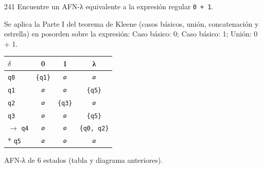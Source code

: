 \documentclass[11pt]{article}
\begin{document}
\begin{ejercicio}{241}{}
Encuentre un AFN-λ equivalente a la expresión regular \texttt{0 + 1}.
\end{ejercicio}
\proc Se aplica la Parte I del teorema de Kleene (casos básicos, unión, concatenación y estrella) en posorden sobre la expresión: Caso básico: 0; Caso básico: 1; Unión: 0 + 1.
\begin{center}\small\begin{tabular}{lccc}\toprule
$\delta$ & 0 & 1 & λ \\\midrule
 \texttt{q0} & \texttt{\{q1\}} & \texttt{∅} & \texttt{∅} \\
 \texttt{q1} & \texttt{∅} & \texttt{∅} & \texttt{\{q5\}} \\
 \texttt{q2} & \texttt{∅} & \texttt{\{q3\}} & \texttt{∅} \\
 \texttt{q3} & \texttt{∅} & \texttt{∅} & \texttt{\{q5\}} \\
$\to$ \texttt{q4} & \texttt{∅} & \texttt{∅} & \texttt{\{q0, q2\}} \\
$*$ \texttt{q5} & \texttt{∅} & \texttt{∅} & \texttt{∅} \\
\bottomrule\end{tabular}\end{center}

\resp AFN-λ de 6 estados (tabla y diagrama anteriores).
\end{document}
